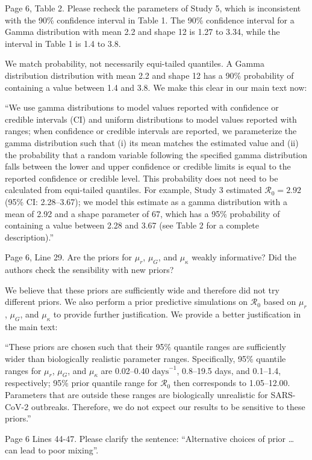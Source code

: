 \documentclass[12pt]{article}
\newcommand{\Ro}{\ensuremath{{\mathcal R}_{0}}\xspace}
\newcommand{\revtext}{\textsf}
\begin{document}
\revtext{Page 6, Table 2. Please recheck the parameters of Study 5, which is inconsistent with the 90\%
confidence interval in Table 1. The 90\% confidence interval for a Gamma distribution with mean
2.2 and shape 12 is 1.27 to 3.34, while the interval in Table 1 is 1.4 to 3.8.}

We match probability, not necessarily equi-tailed quantiles. A Gamma distribution distribution with mean
2.2 and shape 12 has a 90\% probability of containing a value between 1.4 and 3.8. We make this clear in our main text now:

``We use gamma distributions to model values reported with confidence or credible intervals (CI) and uniform distributions to model values reported with ranges;
when confidence or credible intervals are reported, we parameterize the gamma distribution such that (i) its mean matches the estimated value and (ii) the probability that a random variable following the specified gamma distribution falls between the lower and upper confidence or credible limits is equal to the reported confidence or credible level. 
This probability does not need to be calculated from equi-tailed quantiles.
For example, Study 3 estimated $\Ro = 2.92$ (95\% CI: 2.28--3.67);
we model this estimate as a gamma distribution with a mean of 2.92 and a shape parameter of 67, which has a 95\% probability of containing a value between 2.28 and 3.67 (see Table 2 for a complete description).''

\revtext{Page 6, Line 29. Are the priors for $\mu_r$, $\mu_G$, and $\mu_\kappa$ weakly informative? Did the
authors check the sensibility with new priors?}

We believe that these priors are sufficiently wide and therefore did not try different priors.
We also perform a prior predictive simulations on \Ro based on $\mu_r$, $\mu_G$, and $\mu_\kappa$ to provide further justification.
We provide a better justification in the main text:

``These priors are chosen such that their 95\% quantile ranges are sufficiently wider than biologically realistic parameter ranges.
Specifically, 95\% quantile ranges for $\mu_r$, $\mu_G$, and $\mu_\kappa$ are 0.02--0.40 $\mathrm{days}^{-1}$, 0.8--19.5 days, and 0.1--1.4, respectively;
95\% prior quantile range for \Ro then corresponds to 1.05--12.00.
Parameters that are outside these ranges are biologically unrealistic for SARS-CoV-2 outbreaks.
Therefore, we do not expect our results to be sensitive to these priors.''

\revtext{Page 6 Lines 44-47. Please clarify the sentence: “Alternative choices of prior … can lead to
poor mixing”.}
\end{document}
